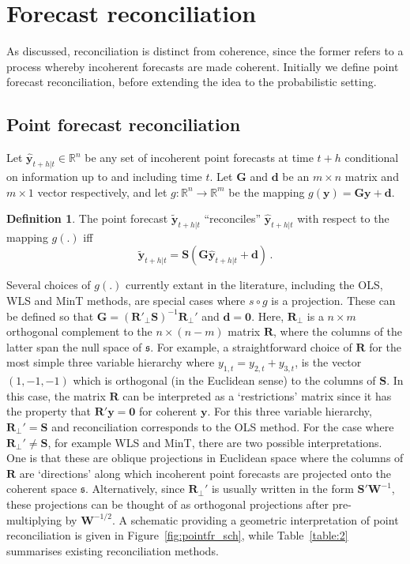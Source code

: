\documentclass[a4paper, 11pt]{article}
\theoremstyle{definition}
\newtheorem{definition}{Definition}[section]
\begin{document}
\section{Forecast reconciliation}\label{sec:reconciliation}

As discussed, reconciliation is distinct from coherence, since the former refers to a process whereby incoherent forecasts are made coherent. Initially we define point forecast reconciliation, before extending the idea to the probabilistic setting.

\subsection{Point forecast reconciliation}

Let $\hat{\bm{y}}_{t+h|t} \in \mathbb{R}^n$ be any set of incoherent point forecasts at time $t+h$ conditional on information up to and including time $t$. Let $\bm{G}$ and $\bm{d}$ be an $m\times n$ matrix and $m\times 1$ vector respectively, and let $g:\mathbb{R}^n \rightarrow \mathbb{R}^m$ be the mapping $g(\bm{y})=\bm{G}\bm{y}+\bm{d}$.

\begin{definition}\label{def:reconpoint}
	The point forecast $\tilde{\bm{y}}_{t+h|t}$ ``reconciles'' $\hat{\bm{y}}_{t+h|t}$ with respect to the mapping $g(.)$ iff
	\begin{equation}
	  \tilde{\bm{y}}_{t+h|t}=\bm{S}(\bm{G}\hat{\bm{y}}_{t+h|t}+\bm{d})\,.
	\end{equation}
\end{definition}

Several choices of $g(.)$ currently extant in the literature, including the OLS, WLS and MinT methods, are special cases where $s\circ g$ is a projection. These can be defined so that $\bm{G}=({\bm{R}'_{\perp}}\bm{S})^{-1}\bm{R}_{\perp}'$ and $\bm{d}=\bm{0}$. Here, ${\bm{R}_{\perp}}$ is a $n\times m$ orthogonal complement to the $n \times (n-m)$ matrix $\bm{R}$, where the columns of the latter span the null space of $\mathfrak{s}$. For example, a straightforward choice of $\bm{R}$ for the most simple three variable hierarchy where $y_{1,t}=y_{2,t}+y_{3,t}$, is the vector $(1,-1,-1)$ which is orthogonal (in the Euclidean sense) to the columns of $\bm{S}$. In this case, the matrix $\bm{R}$ can be interpreted as a `restrictions' matrix since it has the property that $\bm{R}'\bm{y}=\bm{0}$ for coherent $\bm{y}$. For this three variable hierarchy, $\bm{R}_\perp'=\bm{S}$ and reconciliation corresponds to the OLS method. For the case where $\bm{R}_\perp'\neq\bm{S}$, for example WLS and MinT, there are two possible interpretations. One is that these are oblique projections in Euclidean space where the columns of $\bm{R}$ are `directions' along which incoherent point forecasts are projected onto the coherent space $\mathfrak{s}$. Alternatively, since $\bm{R}_\perp'$ is usually written in the form $\bm{S}'{\bm{W}}^{-1}$, these projections can be thought of as orthogonal projections after pre-multiplying by ${\bm{W}^{-1/2}}$. A schematic providing a geometric interpretation of point reconciliation is given in Figure~\ref{fig:pointfr_sch}, while Table~\ref{table:2} summarises existing reconciliation methods.
\end{document}
